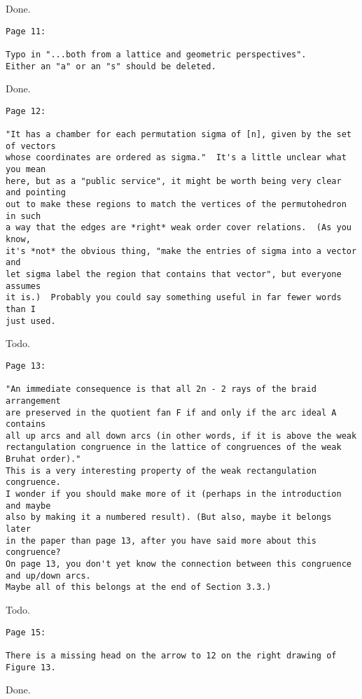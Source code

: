\documentclass{article}
\begin{document}
Done.

\begin{verbatim}
Page 11:

Typo in "...both from a lattice and geometric perspectives".  
Either an "a" or an "s" should be deleted.
\end{verbatim}

Done.

\begin{verbatim}
Page 12:

"It has a chamber for each permutation sigma of [n], given by the set of vectors 
whose coordinates are ordered as sigma."  It's a little unclear what you mean 
here, but as a "public service", it might be worth being very clear and pointing 
out to make these regions to match the vertices of the permutohedron in such 
a way that the edges are *right* weak order cover relations.  (As you know, 
it's *not* the obvious thing, "make the entries of sigma into a vector and 
let sigma label the region that contains that vector", but everyone assumes 
it is.)  Probably you could say something useful in far fewer words than I 
just used.
\end{verbatim}

Todo.

\begin{verbatim}
Page 13:

"An immediate consequence is that all 2n - 2 rays of the braid arrangement 
are preserved in the quotient fan F if and only if the arc ideal A contains 
all up arcs and all down arcs (in other words, if it is above the weak 
rectangulation congruence in the lattice of congruences of the weak Bruhat order)."  
This is a very interesting property of the weak rectangulation congruence.  
I wonder if you should make more of it (perhaps in the introduction and maybe 
also by making it a numbered result). (But also, maybe it belongs later 
in the paper than page 13, after you have said more about this congruence?  
On page 13, you don't yet know the connection between this congruence and up/down arcs.  
Maybe all of this belongs at the end of Section 3.3.)
\end{verbatim}

Todo.

\begin{verbatim}
Page 15:  

There is a missing head on the arrow to 12 on the right drawing of Figure 13.
\end{verbatim}

Done.
\end{document}
